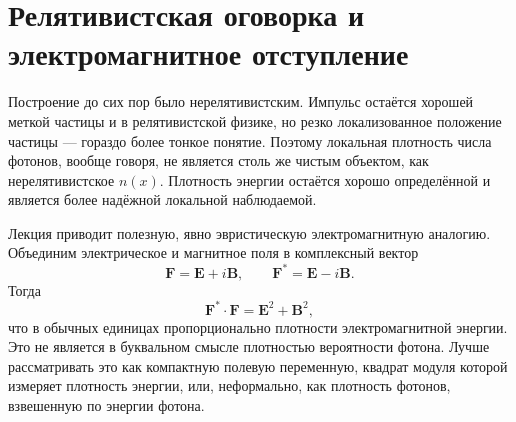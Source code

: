 \begin{classroomqa}
\end{classroomqa}

\section{Релятивистская оговорка и электромагнитное отступление}

Построение до сих пор было нерелятивистским. Импульс остаётся хорошей меткой частицы и в релятивистской физике, но резко локализованное положение частицы — гораздо более тонкое понятие. Поэтому локальная плотность числа фотонов, вообще говоря, не является столь же чистым объектом, как нерелятивистское \(n(x)\). Плотность энергии остаётся хорошо определённой и является более надёжной локальной наблюдаемой.

Лекция приводит полезную, явно эвристическую электромагнитную аналогию. Объединим электрическое и магнитное поля в комплексный вектор
\begin{equation}
\mathbf F=\mathbf E+i\mathbf B,
\qquad
\mathbf F^*=\mathbf E-i\mathbf B.
\label{eq:l07-riemann-silberstein}
\end{equation}
Тогда
\begin{equation}
\mathbf F^*\mathbin{\cdot}\mathbf F
=\mathbf E^2+\mathbf B^2,
\label{eq:l07-em-density}
\end{equation}
что в обычных единицах пропорционально плотности электромагнитной энергии. Это не является в буквальном смысле плотностью вероятности фотона. Лучше рассматривать это как компактную полевую переменную, квадрат модуля которой измеряет плотность энергии, или, неформально, как плотность фотонов, взвешенную по энергии фотона.

\begin{classroomqa}
\end{classroomqa}

